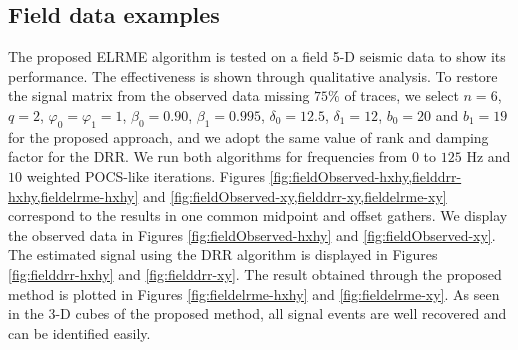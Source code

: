 \subsection{Field data examples}

The proposed ELRME algorithm is tested on a field 5-D seismic data to show its performance. The effectiveness is shown through qualitative analysis. To restore the signal matrix from the observed data missing $75\%$ of traces, we select {${n} = 6$}, {${q} = 2$}, ${\varphi_0 = \varphi_1} = 1$, ${\beta_0} = 0.90$, ${\beta_1} = 0.995$, ${\delta_0} = 12.5$, ${\delta_1} = 12$, ${b_0} = 20$ and ${b_1} = 19$ for the proposed approach, and we adopt the same value of rank and damping factor for the DRR. We run both algorithms for frequencies from $ 0 $ to $ 125 $ Hz and $10$ weighted POCS-like iterations. Figures \ref{fig:fieldObserved-hxhy,fielddrr-hxhy,fieldelrme-hxhy} and \ref{fig:fieldObserved-xy,fielddrr-xy,fieldelrme-xy} correspond to the results in one common midpoint and offset gathers. We display the observed data in Figures \ref{fig:fieldObserved-hxhy} and \ref{fig:fieldObserved-xy}. The estimated signal using the DRR algorithm is displayed in Figures \ref{fig:fielddrr-hxhy} and \ref{fig:fielddrr-xy}. The result obtained through the proposed method is plotted in Figures \ref{fig:fieldelrme-hxhy} and \ref{fig:fieldelrme-xy}.  As seen in the 3-D cubes of the proposed method, all signal events are well recovered and can be identified easily. 


